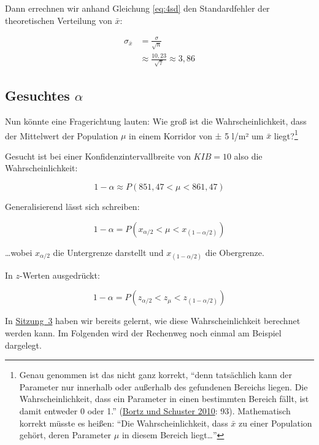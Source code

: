 \documentclass[
  11pt,
  ngerman,
  a4paper,
]{report}
\begin{document}
Dann errechnen wir anhand Gleichung \eqref{eq:4sd} den Standardfehler der theoretischen Verteilung von \(\bar{x}\):

\nopagebreak

\[\begin{aligned}
\sigma_{\bar{x}}&=\frac{\sigma}{\sqrt{n}}\\[4pt]
           &\approx\frac{10{,}23}{\sqrt{7}}\approx3,86
\end{aligned}\]

\hypertarget{gesuchtes-alpha}{%
\subsection{\texorpdfstring{Gesuchtes \(\alpha\)}{Gesuchtes \textbackslash alpha}}\label{gesuchtes-alpha}}

Nun könnte eine Fragerichtung lauten: Wie groß ist die Wahrscheinlichkeit, dass der Mittelwert der Population \(\mu\) in einem Korridor von ± 5 l/m² um \(\bar{x}\) liegt?\footnote{Genau genommen ist das nicht ganz korrekt, \enquote{denn tatsächlich kann der Parameter nur innerhalb oder außerhalb des gefundenen Bereichs liegen. Die Wahrscheinlichkeit, dass ein Parameter in einen bestimmten Bereich fällt, ist damit entweder 0 oder 1.} (\protect\hyperlink{ref-bortz}{Bortz und Schuster 2010}: 93). Mathematisch korrekt müsste es heißen: \enquote{Die Wahrscheinlichkeit, dass \(\bar{x}\) zu einer Population gehört, deren Parameter \(\mu\) in diesem Bereich liegt\ldots{}}}

Gesucht ist bei einer Konfidenzintervallbreite von \(\textit{KIB}=10\) also die Wahrscheinlichkeit:

\nopagebreak

\[1-\alpha\approx P(851{,}47 < \mu < 861{,}47)\]

Generalisierend lässt sich schreiben:

\nopagebreak

\[
1-\alpha=P(x_{\alpha/2} < \mu < x_{(1-\alpha/2)})
\]

\nopagebreak

\ldots wobei \(x_{\alpha/2}\) die Untergrenze darstellt und \(x_{(1-\alpha/2)}\) die Obergrenze.

In \(z\)-Werten ausgedrückt:

\nopagebreak

\[
1-\alpha=P(z_{\alpha/2} < z_{\mu} < z_{(1-\alpha/2)})
\label{eq:konf}
\]

In \protect\hyperlink{wahrscheinlichkeitsrechnung-mit-standardnormalverteilung}{Sitzung~3} haben wir bereits gelernt, wie diese Wahrscheinlichkeit berechnet werden kann. Im Folgenden wird der Rechenweg noch einmal am Beispiel dargelegt.
\end{document}

